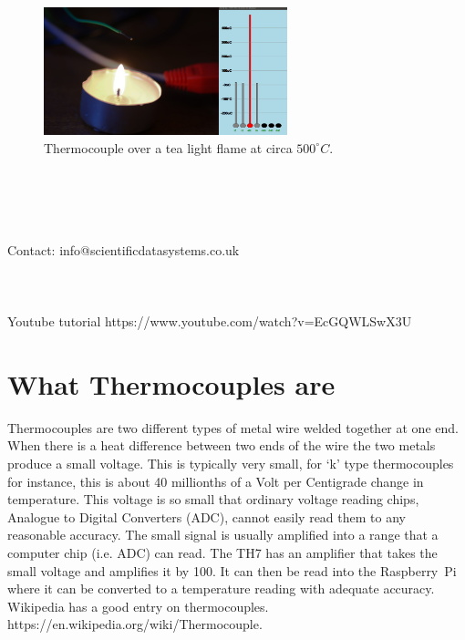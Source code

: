 \documentclass[10pt,foldmark]{leaflet}
\begin{document}
\clearpage
\begin{figure}[ht]
 \centering
 \includegraphics[width=200pt]{TH7_tea_light.jpg}
 \caption{Thermocouple over a tea light flame at circa ${500}^{\circ} C$.}
 \label{fig:pi}
\end{figure}
\mbox{}
\\
\\
\\
\\
\vspace{0.5cm}
Contact: info@scientificdatasystems.co.uk
\\
\\
\\
\\
Youtube tutorial https://www.youtube.com/watch?v=EcGQWLSwX3U
\vspace{0.5cm}
\clearpage

\section{What Thermocouples are}

Thermocouples are two different types of metal wire welded together
at one end.
When there is a heat difference between two ends of the wire
the two metals produce a small voltage.
This is typically very small, for `k' type thermocouples for instance,
this is about 40 millionths of a Volt per Centigrade change in temperature.
%
This voltage is so small that ordinary voltage reading chips, Analogue to Digital Converters (ADC),  cannot easily read them
to any reasonable accuracy.
%
The small signal is usually amplified
into a range that a computer chip (i.e. ADC) can read.
%
The TH7 has an amplifier that takes the small voltage and amplifies it by 100.
%
It can then be read into the Raspberry~Pi where it can be converted to
a temperature reading with adequate accuracy.
%
Wikipedia has a good entry on thermocouples.
https://en.wikipedia.org/wiki/Thermocouple.
\end{document}
